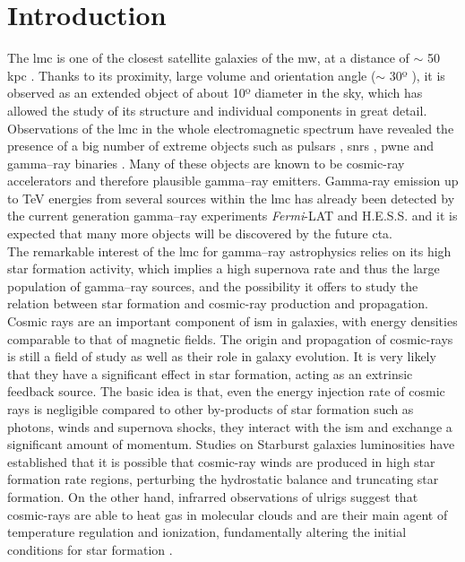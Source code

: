 \documentclass{article}
\begin{document}
\section{Introduction}
The \gls{lmc} is one of the closest satellite galaxies of the \gls{mw}, at a distance of $\sim$ 50 kpc \cite{2013LMCdistance1}. Thanks to its proximity, large volume and orientation angle ($\sim$ 30º \cite{2004StructureandOrientationLMC}), it is observed as an extended object of about 10º diameter in the sky, which has allowed the study of its structure and individual components in great detail. Observations of the \gls{lmc} in the whole electromagnetic spectrum have revealed the presence of a big number of extreme objects such as pulsars \cite{2013RadioPulsarsLMC} \cite{2016LMCFermiLAT}, \glspl{snr} \cite{2015MultiwavelengthLMCsnr} \cite{2012XMM1987} \cite{2016SNRinXrayLMC},  \gls{pwne} \cite{2015HESSTeVLMC} \cite{2016LMCFermiLAT} \cite{2003PWNeintheLMC} \cite{2008PWNeXrayLMC} and gamma--ray binaries \cite{2017HESSLMCP3}. Many of these objects are known to be cosmic-ray accelerators and therefore plausible gamma--ray emitters. Gamma-ray emission up to TeV energies from several sources within the \gls{lmc} has already been detected by the current generation gamma--ray experiments \textit{Fermi}-LAT and H.E.S.S. and it is expected that many more objects will be discovered by the future \gls{cta}.\\
The remarkable interest of the \gls{lmc} for gamma--ray astrophysics relies on its high star formation activity, which implies a high supernova rate and thus the large population of gamma--ray sources,
and the possibility it offers to study the relation between star formation and cosmic-ray production and propagation.\\
Cosmic rays are an important component of \gls{ism} in galaxies, with energy densities comparable to that of magnetic fields. The origin and propagation of cosmic-rays is still a field of study as well as their role in galaxy evolution. It is very likely that they have a significant effect in star formation, acting as an extrinsic feedback source. The basic idea is that, even the energy injection rate of cosmic rays is negligible compared to other by-products of star formation such as photons, winds and supernova shocks, they interact with the \gls{ism} and exchange a significant amount of momentum. Studies on Starburst galaxies luminosities \cite{2008SocratesCRandSF} have established that it is possible that cosmic-ray winds are produced in high star formation rate regions, perturbing the hydrostatic balance and truncating star formation. On the other hand, infrarred observations of \gls{ulrigs} suggest that cosmic-rays are able to heat gas in molecular clouds and are their main agent of temperature regulation and ionization, fundamentally altering the initial conditions for star formation \cite{2010PapadopoulosCRinSF}.\\
\end{document}
